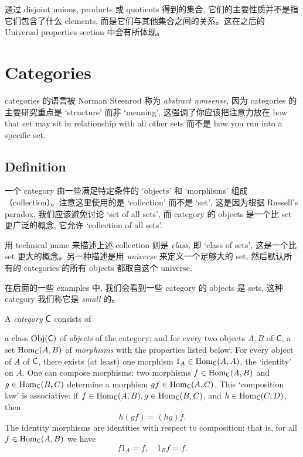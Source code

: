 通过 disjoint unions, products 或 quotients 得到的集合, 它们的主要性质并不是指它们包含了什么 elements, 而是它们与其他集合之间的关系。这在之后的 Universal properties section 中会有所体现。

\section{Categories}\label{sec:1.3}

categories 的语言被 Norman Steenrod 称为 \emph{abstract nonsense}, 因为 categories 的主要研究重点是 `structure' 而非 `meaning', 这强调了你应该把注意力放在 how that set may sit in relationship with all other sets 而不是 how you run into a specific set.

\subsection{Definition}\label{sec:1.3.1}

一个 category 由一些满足特定条件的 `objects' 和 `morphisms' 组成（collection）。注意这里使用的是 `collection' 而不是 `set', 这是因为根据 Russell's paradox, 我们应该避免讨论 `set of all sets', 而 category 的 objects 是一个比 set 更广泛的概念, 它允许 `collection of all sets'.

用 technical name 来描述上述 collection 则是 \emph{class}, 即 `class of sets', 这是一个比 set 更大的概念。另一种描述是用 \emph{universe} 来定义一个足够大的 set, 然后默认所有的 categories 的所有 objects 都取自这个 universe.

在后面的一些 examples 中, 我们会看到一些 category 的 objects 是 sets, 这种 category 我们称它是 \emph{small} 的。

\begin{definition}[Category]\label{def:category}
    A \emph{category} $\operatorname{\mathsf{C}}$ consists of
    \begin{outline}
        \1 a class $\operatorname{Obj}(\operatorname{\mathsf{C}})$ of \emph{objects} of the category; and
        \1 for every two objects $A, B$ of $\operatorname{\mathsf{C}}$, a set $\operatorname{Hom}_{\operatorname{\mathsf{C}}}(A, B)$ of \emph{morphisms} with the properties listed below.
        \2 For every object of $A$ of $\operatorname{\mathsf{C}}$, there exists (at least) one morphism $1_A \in \operatorname{Hom}_{\operatorname{\mathsf{C}}}(A, A)$, the `identity' on $A$.
        \2 One can compose morphisms: two morphisms $f \in \operatorname{Hom}_{\operatorname{\mathsf{C}}}(A, B)$ and $g \in \operatorname{Hom}_{\operatorname{\mathsf{C}}}(B, C)$ determine a morphism $gf \in \operatorname{Hom}_{\operatorname{\mathsf{C}}}(A, C)$.
        \2 This `composition law' is associative: if \(f \in \operatorname{Hom}_{\operatorname{\mathsf{C}}}(A, B), g \in \operatorname{Hom}_{\operatorname{\mathsf{C}}}(B, C)\), and \(h \in \operatorname{Hom}_{\operatorname{\mathsf{C}}}(C, D)\), then
        \[
            h(gf) = (hg)f.
        \]
        \2 The identity morphisms are identities with respect to composition: that is, for all \(f \in \operatorname{Hom}_{\operatorname{\mathsf{C}}}(A, B)\) we have
        \[
            f 1_A = f, \quad 1_B f = f.
        \]
    \end{outline}
\end{definition}

